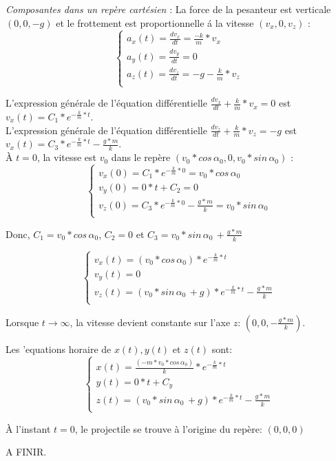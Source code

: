 \documentclass[]{book}
\theoremstyle{definition}
\begin{document}
\emph{Composantes dans un rep\`ere cart\'esien} : 
 La force de la pesanteur est verticale $(0,0,-g)$ et le frottement est proportionnelle \'a la vitesse $(v_x,0,v_z)$ :
$$
\left\{
\begin{array}{l}
 a_x(t) = \frac{dv_x}{dt} = \frac{-k}{m}*v_x \\
 a_y(t) = \frac{dv_y}{dt} =0 \\
 a_z(t) = \frac{dv_z}{dt} = -g - \frac{k}{m} * v_z \\
\end{array}
\right. 
$$

L'expression g\'en\'erale de l'\'equation diff\'erentielle $\frac{dv_x}{dt} + \frac{k}{m}*v_x = 0$ est $v_x(t) = C_1*e^{-\frac{k}{m}*t}$. \\

L'expression g\'en\'erale de l'\'equation diff\'erentielle $\frac{dv_z}{dt} + \frac{k}{m}*v_z = -g$ est $v_x(t) = C_3*e^{-\frac{k}{m}*t} -\frac{g*m}{k}$. \\


\`A $t=0$, la vitesse est $v_0$ dans le rep\`ere $(v_0*cos\, \alpha_0, 0, v_0*sin\, \alpha_0)$ :
$$
\left\{
\begin{array}{l}
 v_x(0) = C_1*e^{-\frac{k}{m}*0} = v_0*cos\, \alpha_0\\
 v_y(0) = 0*t+C_2 = 0 \\
 v_z(0) = C_3*e^{-\frac{k}{m}*0} - \frac{g*m}{k} = v_0*sin\, \alpha_0\\
\end{array}
\right. 
$$

Donc, $C_1 = v_0*cos\, \alpha_0$, $C_2 = 0$ et $C_3 = v_0*sin\, \alpha_0\, + \frac{g*m}{k}$

$$
\left\{
\begin{array}{l}
 v_x(t) = (v_0*cos\, \alpha_0)*e^{-\frac{k}{m}*t}\\
 v_y(t) = 0 \\
 v_z(t) = (v_0*sin\, \alpha_0\, + g)*e^{-\frac{k}{m}*t} - \frac{g*m}{k} \\
\end{array}
\right. 
$$


Lorsque $t \to \infty$, la vitesse devient constante sur l'axe $z$: $(0,0,-\frac{g*m}{k})$.

Les 'equations horaire de $x(t), y(t)$ et $z(t)$ sont: 
$$
\left\{
\begin{array}{l}
 x(t) = \frac{(-m*v_0*cos\, \alpha_0)}{k}*e^{-\frac{k}{m}*t}\\
 y(t) = 0*t + C_y \\
 z(t) = (v_0*sin\, \alpha_0\, + g)*e^{-\frac{k}{m}*t} - \frac{g*m}{k} \\
\end{array}
\right. 
$$

\`A l'instant $t=0$, le projectile se trouve \`a l'origine du rep\`ere: $(0,0,0)$



A FINIR.
\end{document}
